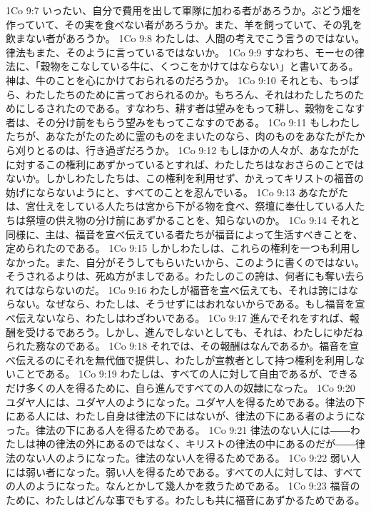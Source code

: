 1Co 9:7  いったい、自分で費用を出して軍隊に加わる者があろうか。ぶどう畑を作っていて、その実を食べない者があろうか。また、羊を飼っていて、その乳を飲まない者があろうか。
1Co 9:8  わたしは、人間の考えでこう言うのではない。律法もまた、そのように言っているではないか。
1Co 9:9  すなわち、モーセの律法に、「穀物をこなしている牛に、くつこをかけてはならない」と書いてある。神は、牛のことを心にかけておられるのだろうか。
1Co 9:10  それとも、もっぱら、わたしたちのために言っておられるのか。もちろん、それはわたしたちのためにしるされたのである。すなわち、耕す者は望みをもって耕し、穀物をこなす者は、その分け前をもらう望みをもってこなすのである。
1Co 9:11  もしわたしたちが、あなたがたのために霊のものをまいたのなら、肉のものをあなたがたから刈りとるのは、行き過ぎだろうか。
1Co 9:12  もしほかの人々が、あなたがたに対するこの権利にあずかっているとすれば、わたしたちはなおさらのことではないか。しかしわたしたちは、この権利を利用せず、かえってキリストの福音の妨げにならないようにと、すべてのことを忍んでいる。
1Co 9:13  あなたがたは、宮仕えをしている人たちは宮から下がる物を食べ、祭壇に奉仕している人たちは祭壇の供え物の分け前にあずかることを、知らないのか。
1Co 9:14  それと同様に、主は、福音を宣べ伝えている者たちが福音によって生活すべきことを、定められたのである。
1Co 9:15  しかしわたしは、これらの権利を一つも利用しなかった。また、自分がそうしてもらいたいから、このように書くのではない。そうされるよりは、死ぬ方がましである。わたしのこの誇は、何者にも奪い去られてはならないのだ。
1Co 9:16  わたしが福音を宣べ伝えても、それは誇にはならない。なぜなら、わたしは、そうせずにはおれないからである。もし福音を宣べ伝えないなら、わたしはわざわいである。
1Co 9:17  進んでそれをすれば、報酬を受けるであろう。しかし、進んでしないとしても、それは、わたしにゆだねられた務なのである。
1Co 9:18  それでは、その報酬はなんであるか。福音を宣べ伝えるのにそれを無代価で提供し、わたしが宣教者として持つ権利を利用しないことである。
1Co 9:19  わたしは、すべての人に対して自由であるが、できるだけ多くの人を得るために、自ら進んですべての人の奴隷になった。
1Co 9:20  ユダヤ人には、ユダヤ人のようになった。ユダヤ人を得るためである。律法の下にある人には、わたし自身は律法の下にはないが、律法の下にある者のようになった。律法の下にある人を得るためである。
1Co 9:21  律法のない人には――わたしは神の律法の外にあるのではなく、キリストの律法の中にあるのだが――律法のない人のようになった。律法のない人を得るためである。
1Co 9:22  弱い人には弱い者になった。弱い人を得るためである。すべての人に対しては、すべての人のようになった。なんとかして幾人かを救うためである。
1Co 9:23  福音のために、わたしはどんな事でもする。わたしも共に福音にあずかるためである。
